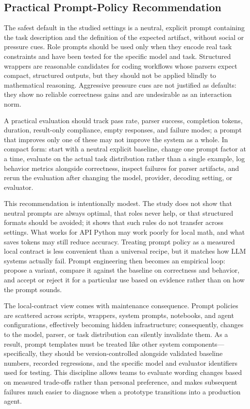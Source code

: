 \documentclass{llncs}
\begin{document}
\subsection{Practical Prompt-Policy Recommendation}\label{practical-prompt-policy-recommendation}

The safest default in the studied settings is a neutral, explicit prompt containing the task description and the definition of the expected artifact, without social or pressure cues. Role prompts should be used only when they encode real task constraints and have been tested for the specific model and task. Structured wrappers are reasonable candidates for coding workflows whose parsers expect compact, structured outputs, but they should not be applied blindly to mathematical reasoning. Aggressive pressure cues are not justified as defaults: they show no reliable correctness gains and are undesirable as an interaction norm.

A practical evaluation should track pass rate, parser success, completion tokens, duration, result-only compliance, empty responses, and failure modes; a prompt that improves only one of these may not improve the system as a whole. In compact form: start with a neutral explicit baseline, change one prompt factor at a time, evaluate on the actual task distribution rather than a single example, log behavior metrics alongside correctness, inspect failures for parser artifacts, and rerun the evaluation after changing the model, provider, decoding setting, or evaluator.

This recommendation is intentionally modest. The study does not show that neutral prompts are always optimal, that roles never help, or that structured formats should be avoided; it shows that such rules do not transfer across settings. What works for API Python may work poorly for local math, and what saves tokens may still reduce accuracy. Treating prompt policy as a measured local contract is less convenient than a universal recipe, but it matches how LLM systems actually fail. Prompt engineering then becomes an empirical loop: propose a variant, compare it against the baseline on correctness and behavior, and accept or reject it for a particular use based on evidence rather than on how the prompt sounds.

The local-contract view comes with maintenance consequence. Prompt policies are scattered across scripts, wrappers, system prompts, notebooks, and agent configurations, effectively becoming hidden infrastructure; consequently, changes to the model, parser, or task distribution can silently invalidate them. As a result, prompt templates must be treated like other system components—specifically, they should be version-controlled alongside validated baseline numbers, recorded regressions, and the specific model and evaluator identifiers used for testing. This discipline allows teams to evaluate wording changes based on measured trade-offs rather than personal preference, and makes subsequent failures much easier to diagnose when a prototype transitions into a production agent.
\end{document}
